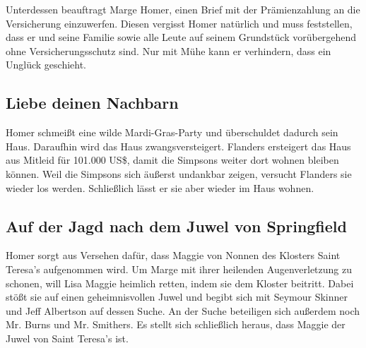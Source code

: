 Unterdessen beauftragt Marge Homer, einen Brief mit der Prämienzahlung an die Versicherung einzuwerfen. Diesen vergisst Homer natürlich und muss feststellen, dass er und seine Familie sowie alle Leute auf seinem Grundstück vorübergehend ohne Versicherungsschutz sind. Nur mit Mühe kann er verhindern, dass ein Unglück geschieht.


\subsection{Liebe deinen Nachbarn}
Homer schmeißt eine wilde Mardi-Gras-Party und überschuldet dadurch sein Haus. Daraufhin wird das Haus zwangsversteigert. Flanders ersteigert das Haus aus Mitleid für 101.000 US\$, damit die Simpsons weiter dort wohnen bleiben können. Weil die Simpsons sich äußerst undankbar zeigen, versucht Flanders sie wieder los werden. Schließlich lässt er sie aber wieder im Haus wohnen.



\subsection{Auf der Jagd nach dem Juwel von Springfield}\label{LABF04}
Homer sorgt aus Versehen dafür, dass Maggie von Nonnen des Klosters Saint Teresa's aufgenommen wird. Um Marge mit ihrer heilenden Augenverletzung zu schonen, will Lisa Maggie heimlich retten, indem sie dem Kloster beitritt. Dabei stößt sie auf einen geheimnisvollen Juwel und begibt sich mit Seymour Skinner und Jeff Albertson auf dessen Suche. An der Suche beteiligen sich außerdem noch Mr. Burns und Mr. Smithers. Es stellt sich schließlich heraus, dass Maggie der Juwel von Saint Teresa's ist. 

